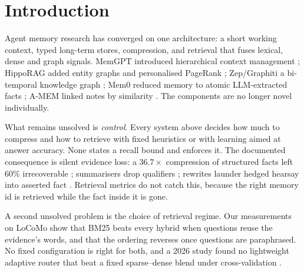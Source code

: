 \documentclass[conference]{IEEEtran}
\begin{document}
\section{Introduction}
Agent memory research has converged on one architecture: a short working context, typed long-term stores, compression, and retrieval that fuses lexical, dense and graph signals. MemGPT introduced hierarchical context management \cite{memgpt}; HippoRAG added entity graphs and personalised PageRank \cite{hipporag}; Zep/Graphiti a bi-temporal knowledge graph \cite{zep}; Mem0 reduced memory to atomic LLM-extracted facts \cite{mem0}; A-MEM linked notes by similarity \cite{amem}. The components are no longer novel individually.

What remains unsolved is \emph{control}. Every system above decides how much to compress and how to retrieve with fixed heuristics or with learning aimed at answer accuracy. None states a recall bound and enforces it. The documented consequence is silent evidence loss: a $36.7\times$ compression of structured facts left 60\% irrecoverable \cite{facts}; summarisers drop qualifiers \cite{fidelity}; rewrites launder hedged hearsay into asserted fact \cite{factwash}. Retrieval metrics do not catch this, because the right memory id is retrieved while the fact inside it is gone.

A second unsolved problem is the choice of retrieval regime. Our measurements on LoCoMo show that BM25 beats every hybrid when questions reuse the evidence's words, and that the ordering reverses once questions are paraphrased. No fixed configuration is right for both, and a 2026 study found no lightweight adaptive router that beat a fixed sparse--dense blend under cross-validation \cite{fairness}.
\end{document}
